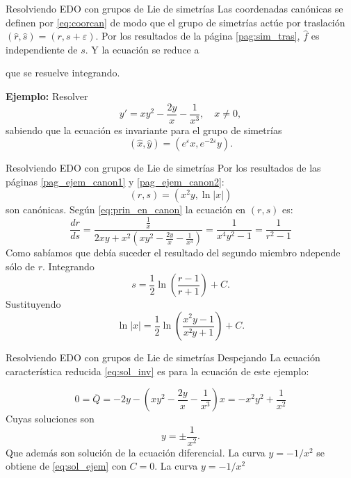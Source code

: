 \documentclass[handout,hyperref={colorlinks=true}]{beamer}
\renewcommand{\epsilon}{\varepsilon}
\begin{document}
\begin{frame}{Resolviendo EDO con grupos de Lie de simetrías}
\onslide<+->Las coordenadas canónicas se definen por \eqref{eq:coorcan} de modo que el grupo de simetrías actúe por traslación $(\hat{r},\hat{s})=(r,s+\epsilon)$. 
\onslide<+->Por los resultados de la página  \ref{pag:sim_tras}, $\hat{f}$ es independiente de $s$. Y la ecuación se reduce a

que se resuelve integrando.


\onslide<+->\textbf{Ejemplo:} Resolver 
\[y'=xy^2-\frac{2y}{x}-\frac{1}{x^3},\quad x\neq 0,\]
sabiendo que la ecuación es invariante para el grupo de simetrías
\[(\hat{x},\hat{y})=(e^{\epsilon}x,e^{-2\epsilon}y).\]
\end{frame}


\begin{frame}{Resolviendo EDO con grupos de Lie de simetrías}
\onslide<+->Por los resultados de las páginas \ref{pag_ejem_canon1} y \ref{pag_ejem_canon2}:
\[(r,s)=(x^2y,\ln|x|)\]
son canónicas.
\onslide<+-> Según \eqref{eq:prin_en_canon} la ecuación en $(r,s)$ es:
\[\frac{dr}{ds}=\frac{\frac{1}{x}}{2xy+x^2\left(  xy^2-\frac{2y}{x}-\frac{1}{x^3}     \right)}=\frac{1}{x^4y^2-1}=\frac{1}{r^2-1}\]
Como sabíamos que debía suceder el resultado del segundo miembro ndepende sólo de $r$. Integrando
\[s=\frac12\ln\left( \frac{r-1}{r+1}  \right)+C.\]
Sustituyendo
\[\ln|x|=\frac12\ln\left( \frac{x^2y-1}{x²y+1}  \right)+C.\]



\end{frame}


\begin{frame}{Resolviendo EDO con grupos de Lie de simetrías}
Despejando
La ecuación característica reducida \eqref{eq:sol_inv} es para la ecuación de este ejemplo:

\[0=\overline{Q}=-2y- \left(xy^2-\frac{2y}{x}-\frac{1}{x^3}  \right)x=-x^2y^2+\frac{1}{x^2}\]
Cuyas soluciones son
\[y=\pm\frac{1}{x^2}.\]
Que además son solución de la ecuación diferencial. La curva $y=-1/x^2$ se obtiene de \eqref{eq:sol_ejem} con $C=0$. La  curva $y=-1/x^2$

\end{frame}
\end{document}
